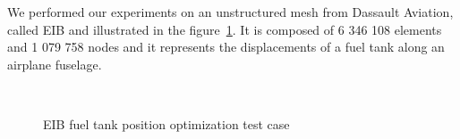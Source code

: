 \documentclass{IOS-Book-Article}
\begin{document}
We performed our experiments on an unstructured mesh from Dassault Aviation, called EIB and illustrated in the figure~\ref{fig:reservoir}.
It is composed of 6 346 108 elements and 1 079 758 nodes and it represents the displacements of a fuel tank along an airplane fuselage.
\begin{figure}[htp]
 \centering
 \\
 \caption{EIB fuel tank position optimization test case}
 \label{fig:reservoir}
\end{figure}
\end{document}
